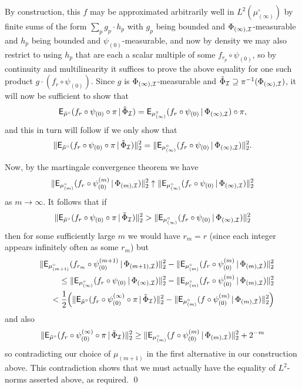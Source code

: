 \documentclass[11pt]{article}
\begin{document}
By construction, this $f$ may be approximated arbitrarily well in
$L^2(\mu^\circ_{(\infty)})$ by finite sums of the form $\sum_p
g_p\cdot h_p$ with $g_p$ being bounded and
$\Phi_{(\infty),\mathcal{I}}$-measurable and $h_p$ being bounded and
$\psi_{(0)}$-measurable, and now by density we may also restrict to
using $h_p$ that are each a scalar multiple of some
$f_{r_p}\circ\psi_{(0)}$, so by continuity and multilinearity it
suffices to prove the above equality for one such product $g\cdot
(f_r\circ\psi_{(0)})$.  Since $g$ is $\Phi_{(\infty),\mathcal{I}}$-measurable
and $\tilde{\Phi}_{\mathcal{I}} \supseteq \pi^{-1}(\Phi_{(\infty),\mathcal{I}})$, it will now be sufficient to show that
\[\mathsf{E}_{\tilde{\mu}^\circ}(f_r\circ\psi_{(0)}\circ\pi\,|\,\tilde{\Phi}_{\mathcal{I}}) =
\mathsf{E}_{\mu_{(\infty)}^\circ}(f_r\circ\psi_{(0)}\,|\,\Phi_{(\infty),\mathcal{I}})\circ\pi,\]
and this in turn will follow if we only show that
\[\|\mathsf{E}_{\tilde{\mu}^\circ}(f_r\circ\psi_{(0)}\circ\pi\,|\,\tilde{\Phi}_{\mathcal{I}})\|_2^2 =
\|\mathsf{E}_{\mu_{(\infty)}^\circ}(f_r\circ\psi_{(0)}\,|\,\Phi_{(\infty),\mathcal{I}})\|_2^2.\]

Now, by the martingale convergence theorem we have
\[\|\mathsf{E}_{\mu^\circ_{(m)}}(f_r\circ\psi^{(m)}_{(0)}\,|\,\Phi_{(m),\mathcal{I}})\|_2^2 \uparrow \|\mathsf{E}_{\mu^\circ_{(\infty)}}(f_r\circ\psi_{(0)}\,|\,\Phi_{(\infty),\mathcal{I}})\|_2^2\]
as $m\to\infty$.  It follows that if
\[\|\mathsf{E}_{\tilde{\mu}^\circ}(f_r\circ\psi_{(0)}\circ\pi\,|\,\tilde{\Phi}_{\mathcal{I}})\|_2^2
>
\|\mathsf{E}_{\mu^\circ_{(\infty)}}(f_r\circ\psi_{(0)}\,|\,\Phi_{(\infty),\mathcal{I}})\|_2^2\]
then for some sufficiently large $m$ we would have $r_m = r$ (since
each integer appears infinitely often as some $r_m$) but
\begin{eqnarray*}
&&\|\mathsf{E}_{\mu^\circ_{(m+1)}}(f_{r_m}\circ\psi^{(m+1)}_{(0)}\,|\,\Phi_{(m+1),\mathcal{I}})\|_2^2
-
\|\mathsf{E}_{\mu^\circ_{(m)}}(f_r\circ\psi^{(m)}_{(0)}\,|\,\Phi_{(m),\mathcal{I}})\|_2^2\\
&& \leq
\|\mathsf{E}_{\mu^\circ_{(\infty)}}(f_r\circ\psi_{(0)}\,|\,\Phi_{(\infty),\mathcal{I}})\|_2^2
-
\|\mathsf{E}_{\mu^\circ_{(m)}}(f_r\circ\psi^{(m)}_{(0)}\,|\,\Phi_{(m),\mathcal{I}})\|_2^2\\
&& <
\frac{1}{2}\Big(\|\mathsf{E}_{\tilde{\mu}^\circ}(f_r\circ\psi^{(\infty)}_{(0)}\circ\pi\,|\,\tilde{\Phi}_{\mathcal{I}})\|_2^2
-
\|\mathsf{E}_{\mu^\circ_{(m)}}(f\circ\psi^{(m)}_{(0)}\,|\,\Phi_{(m),\mathcal{I}})\|_2^2\Big)
\end{eqnarray*}
and also
\[\|\mathsf{E}_{\tilde{\mu}^\circ}(f_r\circ\psi^{(\infty)}_{(0)}\circ\pi\,|\,\tilde{\Phi}_{\mathcal{I}})\|_2^2\geq
\|\mathsf{E}_{\mu^\circ_{(m)}}(f\circ\psi^{(m)}_{(0)}\,|\,\Phi_{(m),\mathcal{I}})\|_2^2
+ 2^{-m}\] so contradicting our choice of $\mu_{(m+1)}$ in the first
alternative in our construction above. This contradiction shows that
we must actually have the equality of $L^2$-norms asserted above, as
required. \qed
\end{document}
